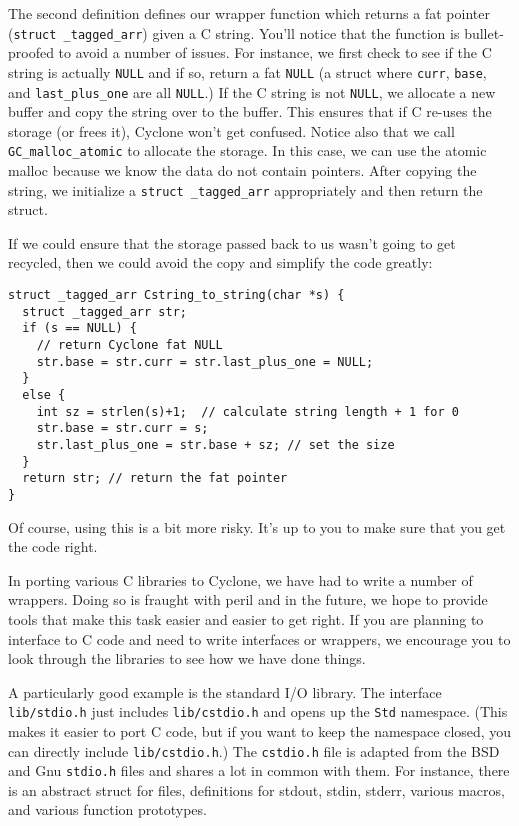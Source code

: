 The second definition defines our wrapper function which returns a fat
pointer (\texttt{struct \_tagged\_arr}) given a C string.  You'll
notice that the function is bullet-proofed to avoid a number of
issues.  For instance, we first check to see if the C string is
actually \texttt{NULL} and if so, return a fat \texttt{NULL} 
(a struct where \texttt{curr}, \texttt{base}, and \texttt{last\_plus\_one}
are all \texttt{NULL}.)  If the C string is not \texttt{NULL},
we allocate a new buffer and copy the string over to the buffer.
This ensures that if C re-uses the storage (or frees it), Cyclone
won't get confused.  Notice also that we call \texttt{GC\_malloc\_atomic}
to allocate the storage.  In this case, we can use the atomic
malloc because we know the data do not contain pointers.
After copying the string, we initialize a \texttt{struct \_tagged\_arr}
appropriately and then return the struct.  

If we could ensure that the storage passed back to us wasn't
going to get recycled, then we could avoid the copy and simplify
the code greatly:
\begin{verbatim}
struct _tagged_arr Cstring_to_string(char *s) {
  struct _tagged_arr str;
  if (s == NULL) {
    // return Cyclone fat NULL
    str.base = str.curr = str.last_plus_one = NULL;
  }
  else {
    int sz = strlen(s)+1;  // calculate string length + 1 for 0
    str.base = str.curr = s; 
    str.last_plus_one = str.base + sz; // set the size
  }
  return str; // return the fat pointer
}
\end{verbatim}
Of course, using this is a bit more risky.  It's up to you
to make sure that you get the code right.

In porting various C libraries to Cyclone, we have had to write
a number of wrappers.  Doing so is fraught with peril and in the
future, we hope to provide tools that make this task easier
and easier to get right.  If you are planning to interface to
C code and need to write interfaces or wrappers, we encourage
you to look through the libraries to see how we have done
things.  

A particularly good example is the standard I/O library.  The
interface \texttt{lib/stdio.h} just includes \texttt{lib/cstdio.h}
and opens up the \texttt{Std} namespace.  (This makes it easier
to port C code, but if you want to keep the namespace closed,
you can directly include \texttt{lib/cstdio.h}.)  The \texttt{cstdio.h}
file is adapted from the BSD and Gnu \texttt{stdio.h} files
and shares a lot in common with them.  For instance, there
is an abstract struct for files, definitions for stdout, stdin,
stderr, various macros, and various function prototypes.

